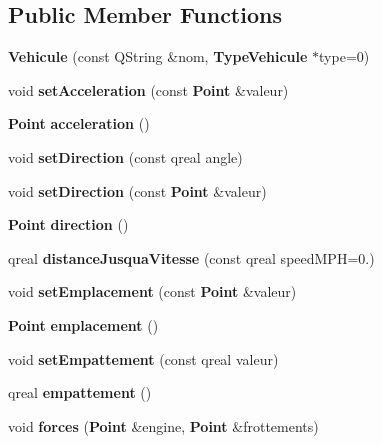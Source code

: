 \subsection*{\-Public \-Member \-Functions}
\begin{DoxyCompactItemize}
\item 
{\bfseries \-Vehicule} (const \-Q\-String \&nom, {\bf \-Type\-Vehicule} $\ast$type=0)\label{class_vehicule_a3fe6a9ec4c5e817844b915ab86e0c753}

\item 
void {\bfseries set\-Acceleration} (const {\bf \-Point} \&valeur)\label{class_vehicule_ae65e3ac798f73e9c2d6df7a5ee935f1d}

\item 
{\bf \-Point} {\bfseries acceleration} ()\label{class_vehicule_ac5b1437932070a5674afb7f6b6c9360f}

\item 
void {\bfseries set\-Direction} (const qreal angle)\label{class_vehicule_abb4d88b85a29c8213a6de37f8c0fdfef}

\item 
void {\bfseries set\-Direction} (const {\bf \-Point} \&valeur)\label{class_vehicule_ab2460a74ebd3126834e9d28887b4b10f}

\item 
{\bf \-Point} {\bfseries direction} ()\label{class_vehicule_ae4113daad8e1bf31c93cee889ba7fc1c}

\item 
qreal {\bfseries distance\-Jusqua\-Vitesse} (const qreal speed\-M\-P\-H=0.)\label{class_vehicule_afcf16212edd9c14764e9f17f92628543}

\item 
void {\bfseries set\-Emplacement} (const {\bf \-Point} \&valeur)\label{class_vehicule_a943bedfb30a165aa53990f2a53923e74}

\item 
{\bf \-Point} {\bfseries emplacement} ()\label{class_vehicule_ae8196e4c14907ffa20fcab69090655aa}

\item 
void {\bfseries set\-Empattement} (const qreal valeur)\label{class_vehicule_ad94493a406fcfe5edb479268eee270b2}

\item 
qreal {\bfseries empattement} ()\label{class_vehicule_ab034d5cf3d55dbf628724f852ae5bb16}

\item 
void {\bfseries forces} ({\bf \-Point} \&engine, {\bf \-Point} \&frottements)\label{class_vehicule_af8f6e75a3b943dacff5e9aa53d82b07e}


\end{DoxyCompactItemize}
